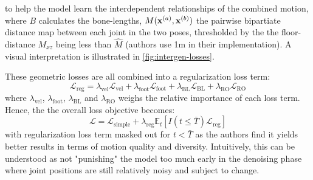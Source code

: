 to help the model learn the interdependent relationships of the combined motion, where $B$ calculates the bone-lengths, $M(\boldsymbol{\mathbf{x}}^{(a)}, \boldsymbol{\mathbf{x}}^{(b)})$ the pairwise bipartiate distance map between each joint in the two poses, thresholded by the the floor-distance $M_{xz}$ being less than $\hat{M}$ (authors use 1m in their implementation). A visual interpretation is illustrated in \cref{fig:intergen-losses}. 

These geometric losses are all combined into a regularization loss term:
\begin{equation}
    \mathcal{L}_\text{reg} = \lambda_\text{vel} \mathcal{L}_\text{vel} + \lambda_\text{foot} \mathcal{L}_\text{foot} + \lambda_\text{BL} \mathcal{L}_\text{BL} + \lambda_\text{RO} \mathcal{L}_\text{RO}
\end{equation}
where $\lambda_\text{vel}$, $\lambda_\text{foot}$, $\lambda_\text{BL}$ and $\lambda_\text{RO}$ weighs the relative importance of each loss term. Hence, the the overall loss objective becomes:
\begin{equation}
    \mathcal{L} = \mathcal{L}_\text{simple} + \lambda_\text{reg} \mathbb{E}_t \left[ I(t \leq \bar{T}) \mathcal{L}_\text{reg} \right]
\end{equation}
with regularization loss term masked out for $t < \bar{T}$ as the authors find it yields better results in terms of motion quality and diversity. Intuitively, this can be understood as not "punishing" the model too much early in the denoising phase where joint positions are still relatively noisy and subject to change.
